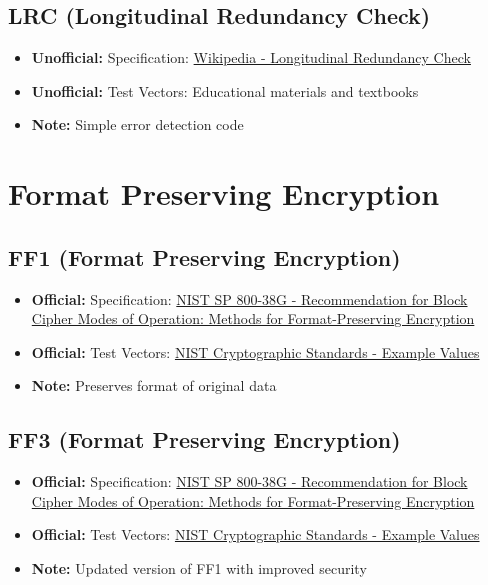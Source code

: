 \documentclass[12pt,a4paper]{article}
\newcommand{\official}[1]{\textcolor{citegreen}{\textbf{Official:}} #1}
\newcommand{\unofficial}[1]{\textcolor{warningred}{\textbf{Unofficial:}} #1}
\newcommand{\note}[1]{\textcolor{noteorange}{\textbf{Note:}} #1}
\newcommand{\link}[2]{\href{#1}{#2}}
\begin{document}
\subsection{LRC (Longitudinal Redundancy Check)}
\begin{itemize}
    \item \unofficial{Specification:} \link{https://en.wikipedia.org/wiki/Longitudinal_redundancy_check}{Wikipedia - Longitudinal Redundancy Check}
    \item \unofficial{Test Vectors:} Educational materials and textbooks
    \item \note{Simple error detection code}
\end{itemize}

\newpage

\section{Format Preserving Encryption}

\subsection{FF1 (Format Preserving Encryption)}
\begin{itemize}
    \item \official{Specification:} \link{https://nvlpubs.nist.gov/nistpubs/SpecialPublications/NIST.SP.800-38G.pdf}{NIST SP 800-38G - Recommendation for Block Cipher Modes of Operation: Methods for Format-Preserving Encryption}
    \item \official{Test Vectors:} \link{https://csrc.nist.gov/Projects/cryptographic-standards-and-guidelines/example-values}{NIST Cryptographic Standards - Example Values}
    \item \note{Preserves format of original data}
\end{itemize}

\subsection{FF3 (Format Preserving Encryption)}
\begin{itemize}
    \item \official{Specification:} \link{https://nvlpubs.nist.gov/nistpubs/SpecialPublications/NIST.SP.800-38G.pdf}{NIST SP 800-38G - Recommendation for Block Cipher Modes of Operation: Methods for Format-Preserving Encryption}
    \item \official{Test Vectors:} \link{https://csrc.nist.gov/Projects/cryptographic-standards-and-guidelines/example-values}{NIST Cryptographic Standards - Example Values}
    \item \note{Updated version of FF1 with improved security}
\end{itemize}
\end{document}
